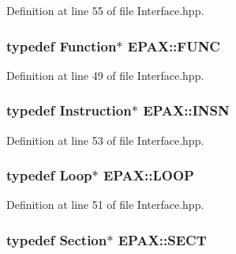 \-Definition at line 55 of file \-Interface.\-hpp.

\hypertarget{namespace_e_p_a_x_a5b05cc89d633ec2241cb3af828c03024}{
\subsubsection[{\-F\-U\-N\-C}]{\setlength{\rightskip}{0pt plus 5cm}typedef \-Function$\ast$ {\bf \-E\-P\-A\-X\-::\-F\-U\-N\-C}}}\label{namespace_e_p_a_x_a5b05cc89d633ec2241cb3af828c03024}


\-Definition at line 49 of file \-Interface.\-hpp.

\hypertarget{namespace_e_p_a_x_a601da5f2ead9a877d566da6cfc9026eb}{
\subsubsection[{\-I\-N\-S\-N}]{\setlength{\rightskip}{0pt plus 5cm}typedef \-Instruction$\ast$ {\bf \-E\-P\-A\-X\-::\-I\-N\-S\-N}}}\label{namespace_e_p_a_x_a601da5f2ead9a877d566da6cfc9026eb}


\-Definition at line 53 of file \-Interface.\-hpp.

\hypertarget{namespace_e_p_a_x_ac236645423e99e8ccc784040ff1f881e}{
\subsubsection[{\-L\-O\-O\-P}]{\setlength{\rightskip}{0pt plus 5cm}typedef \-Loop$\ast$ {\bf \-E\-P\-A\-X\-::\-L\-O\-O\-P}}}\label{namespace_e_p_a_x_ac236645423e99e8ccc784040ff1f881e}


\-Definition at line 51 of file \-Interface.\-hpp.

\hypertarget{namespace_e_p_a_x_a6c4fe59392073737d60d4b99f37ba154}{
\subsubsection[{\-S\-E\-C\-T}]{\setlength{\rightskip}{0pt plus 5cm}typedef \-Section$\ast$ {\bf \-E\-P\-A\-X\-::\-S\-E\-C\-T}}}\label{namespace_e_p_a_x_a6c4fe59392073737d60d4b99f37ba154}


